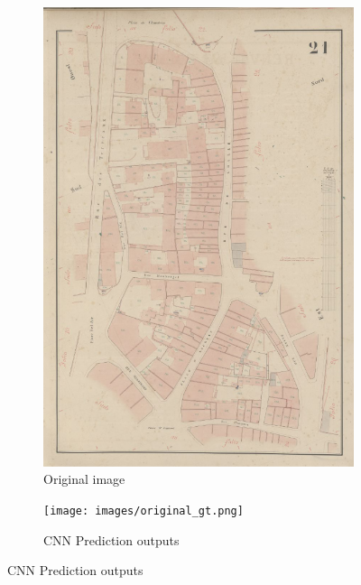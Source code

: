 \documentclass[12pt]{article}
\begin{document}
\begin{figure}[H]
    \centering
	\begin{subfigure}[b]{.3\textwidth}
		\centering
		\includegraphics[width=1\linewidth]{images/original_image.png}  
		\caption{Original image}
	\end{subfigure}
	\begin{subfigure}[b]{.3\textwidth}
		\centering
		\texttt{[image: images/original\_gt.png]}  
		\caption{CNN Prediction outputs}
	\end{subfigure}
	

\end{figure}
\end{document}
